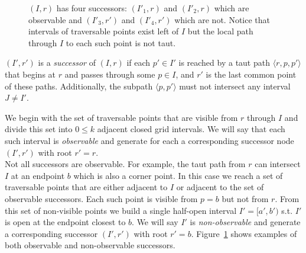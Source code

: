 \begin{figure}[tb]
  \begin{center}
    
  \end{center}
  \caption[Observable and non-observable successors]
{\small
$(I, r)$ has four successors: $(I'_1, r)$ and $(I'_2,r)$ which are observable and $(I'_3, r')$ and $(I'_4, r')$ which are not. Notice that intervals of traversable points exist left of $I$ but the local path through $I$ to each such point is not taut.}
\label{fig::anya::successors}
\end{figure}

\begin{definition}
\label{definition::anya::successors}
$(I', r')$ is a \emph{successor} of
$(I, r)$ if each $p' \in I'$ is reached
by a taut path $\langle r, p,  p' \rangle$ that begins
at $r$ and passes through some $p \in I$, 
and $r'$ is the last common point of these paths.  Additionally, 
the subpath $\langle p, p' \rangle$ must not intersect any 
interval $J \neq I'$.
\end{definition}
We begin with the set of traversable points that are 
visible from $r$ through $I$ and divide this set into $0 \leq k$
adjacent closed grid intervals.
We will say that each such interval is \emph{observable} and 
generate for each a corresponding successor node 
$(I', r')$ with root $r' = r$.
\\
Not all successors are observable.
For example, the taut path from $r$ can intersect 
$I$ at an endpoint $b$ which is also a corner point.
In this case we reach a set of traversable points that 
are either adjacent to $I$ or adjacent to the set of 
observable successors.
Each such point is visible from $p = b$ but not 
from $r$.  From this set of non-visible points we build a 
single half-open interval $I' = [a', b')$ s.t. $I'$ is open at the 
endpoint closest to $b$.
We will say $I'$ is \emph{non-observable} and generate a 
corresponding successor $(I', r')$ with root $r' = b$.  
Figure~\ref{fig::anya::successors} shows examples of both
observable and non-observable successors.
%


